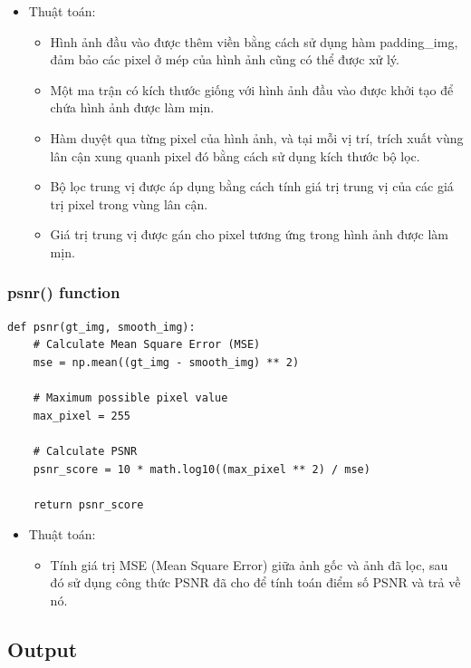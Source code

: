 \documentclass{article}
\begin{document}
\begin{itemize}
    
    \item Thuật toán:
    \begin{itemize}
        \item Hình ảnh đầu vào được thêm viền bằng cách sử dụng hàm padding\_img, đảm bảo các pixel ở mép của hình ảnh cũng có thể được xử lý.
        \item Một ma trận có kích thước giống với hình ảnh đầu vào được khởi tạo để chứa hình ảnh được làm mịn.
        \item Hàm duyệt qua từng pixel của hình ảnh, và tại mỗi vị trí, trích xuất vùng lân cận xung quanh pixel đó bằng cách sử dụng kích thước bộ lọc.
        \item Bộ lọc trung vị được áp dụng bằng cách tính giá trị trung vị của các giá trị pixel trong vùng lân cận.
        \item Giá trị trung vị được gán cho pixel tương ứng trong hình ảnh được làm mịn.
    \end{itemize}
\end{itemize}


\subsubsection{psnr() function}
\begin{lstlisting}[caption={Code of psnr() function}, label={psnr()}]
def psnr(gt_img, smooth_img):
    # Calculate Mean Square Error (MSE)
    mse = np.mean((gt_img - smooth_img) ** 2)

    # Maximum possible pixel value
    max_pixel = 255

    # Calculate PSNR
    psnr_score = 10 * math.log10((max_pixel ** 2) / mse)

    return psnr_score
\end{lstlisting}

\begin{itemize}
    
    \item Thuật toán:
    \begin{itemize}
        \item Tính giá trị MSE (Mean Square Error) giữa ảnh gốc và ảnh đã lọc, sau đó sử dụng công thức PSNR đã cho để tính toán điểm số PSNR và trả về nó.
    \end{itemize}
\end{itemize}



\subsection{Output}
\end{document}
